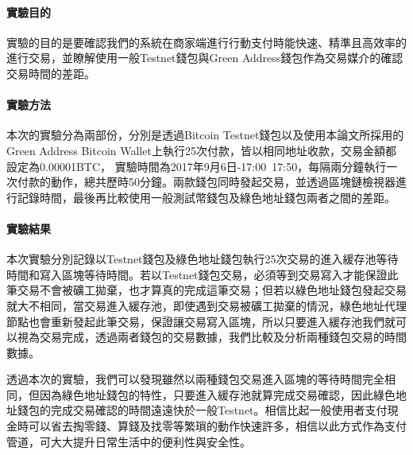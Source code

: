 			\paragraph{實驗目的}實驗的目的是要確認我們的系統在商家端進行行動支付時能快速、精準且高效率的進行交易，並瞭解使用一般Testnet錢包與Green Address錢包作為交易媒介的確認交易時間的差距。
			\paragraph{實驗方法}本次的實驗分為兩部份，分別是透過Bitcoin Testnet錢包以及使用本論文所採用的Green Address Bitcoin Wallet上執行25次付款，皆以相同地址收款，交易金額都設定為0.00001BTC， 實驗時間為2017年9月6日-17:00~17:50，每隔兩分鐘執行一次付款的動作，總共歷時50分鐘。兩款錢包同時發起交易，並透過區塊鏈檢視器進行記錄時間，最後再比較使用一般測試幣錢包及綠色地址錢包兩者之間的差距。
			\paragraph{實驗結果}本次實驗分別記錄以Testnet錢包及綠色地址錢包執行25次交易的進入緩存池等待時間和寫入區塊等待時間。若以Testnet錢包交易，必須等到交易寫入才能保證此筆交易不會被礦工拋棄，也才算真的完成這筆交易；但若以綠色地址錢包發起交易就大不相同，當交易進入緩存池，即使遇到交易被礦工拋棄的情況，綠色地址代理節點也會重新發起此筆交易，保證讓交易寫入區塊，所以只要進入緩存池我們就可以視為交易完成，透過兩者錢包的交易數據，我們比較及分析兩種錢包交易的時間數據。


透過本次的實驗，我們可以發現雖然以兩種錢包交易進入區塊的等待時間完全相同，但因為綠色地址錢包的特性，只要進入緩存池就算完成交易確認，因此綠色地址錢包的完成交易確認的時間遠遠快於一般Testnet。相信比起一般使用者支付現金時可以省去掏零錢、算錢及找零等繁瑣的動作快速許多，相信以此方式作為支付管道，可大大提升日常生活中的便利性與安全性。


    
